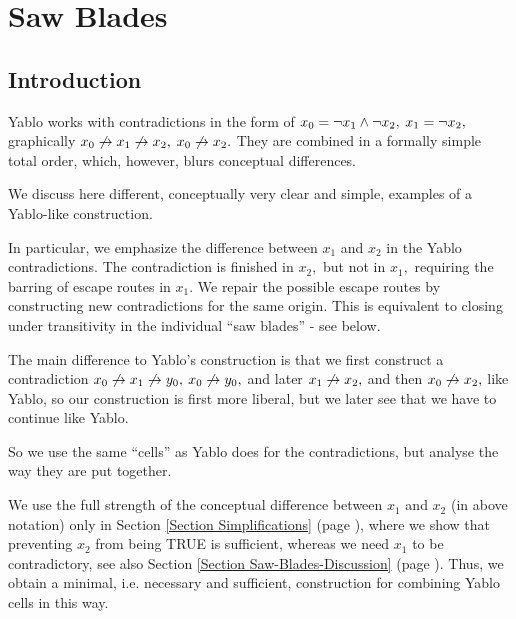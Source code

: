 \vspace{4mm}


\clearpage


\clearpage
\section{
Saw Blades
}


\label{Section Saw-Blades-All}
\subsection{
Introduction
}


Yablo works with contradictions in the form of $x_{0}= \neg x_{1} \wedge
\neg x_{2},$ $x_{1}= \neg x_{2},$
graphically $x_{0} \not\rightarrow x_{1} \not\rightarrow x_{2},$ $x_{0} \not\rightarrow x_{2}.$ They are
combined in a formally simple total
order, which, however, blurs conceptual differences.

We discuss here different, conceptually very clear and simple, examples
of a Yablo-like construction.

In particular, we emphasize the difference between $x_{1}$ and $x_{2}$ in
the
Yablo contradictions. The contradiction is
finished in $x_{2},$ but not in $x_{1},$ requiring the barring of escape
routes in $x_{1}.$
We repair the possible escape routes by constructing new contradictions
for the same origin. This is equivalent to closing under transitivity in
the
individual ``saw blades'' - see below.

The main difference to Yablo's construction is that we first construct a
contradiction
$x_{0} \not\rightarrow x_{1} \not\rightarrow y_{0},$ $x_{0} \not\rightarrow y_{0},$ and later $x_{1} \not\rightarrow
x_{2},$ and then $x_{0} \not\rightarrow x_{2},$ like Yablo, so
our construction is first more liberal, but we later see that we have
to continue like Yablo.

So we use the same ``cells'' as Yablo does for the contradictions, but
analyse
the way they are put together.

We use the full strength of the conceptual difference between $x_{1}$ and
$x_{2}$
(in above notation)
only in Section 
\ref{Section Simplifications} (page 
\pageref{Section Simplifications}), where we show that
preventing
$x_{2}$ from being TRUE is sufficient, whereas we need $x_{1}$ to be
contradictory, see also
Section 
\ref{Section Saw-Blades-Discussion} (page 
\pageref{Section Saw-Blades-Discussion}).
Thus, we obtain a minimal, i.e. necessary and sufficient, construction
for combining Yablo cells in this way.

